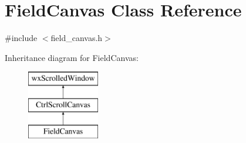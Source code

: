\hypertarget{a00101}{\section{Field\-Canvas Class Reference}
\label{a00101}
}


{\ttfamily \#include $<$field\-\_\-canvas.\-h$>$}

Inheritance diagram for Field\-Canvas\-:\begin{figure}[H]
\begin{center}
\leavevmode
\includegraphics[height=3.000000cm]{a00101}
\end{center}
\end{figure}
